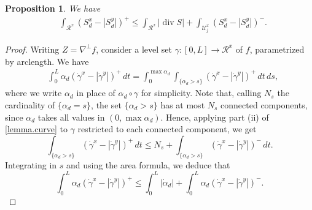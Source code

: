 \documentclass[10pt,a4paper]{amsart}
\newtheorem{proposition}{Proposition}
\DeclareMathOperator{\dive}{div}
\newcommand{\hau}{\mathcal{H}}
\newcommand{\str}{\mathcal{U}}
\begin{document}
\begin{proposition}\label{complement.bis}
	We have
	\begin{align*}
		&\int_{\mathcal{R}^x}(S_d^x-|S_d^y|)^+
		\le\int_{\mathcal{R}^x}\lvert \dive S\rvert+\int_{\str_j^x}(S_d^x-|S_d^y|)^-.
	\end{align*}
\end{proposition}

\begin{proof}
	Writing $Z=\nabla^\perp f$, consider a level set $\gamma:[0,L]\to\mathcal{R}^x$ of $f$, parametrized by arclength.
	We have
	\begin{align*}
		&\int_0^L\alpha_d(\dot\gamma^x-|\dot\gamma^y|)^+\,dt
		=\int_0^{\max\alpha_d}\int_{\{\alpha_d>s\}}(\dot\gamma^x-|\dot\gamma^y|)^+\,dt\,ds,
	\end{align*}
	where we write $\alpha_d$ in place of $\alpha_d\circ\gamma$ for simplicity.
	Note that, calling $N_s$ the cardinality of $\{\alpha_d=s\}$, the set $\{\alpha_d>s\}$
	has at most $N_s$ connected components, since $\alpha_d$
	takes all values in $(0,\max\alpha_d)$. Hence, applying part (ii) of
	\cref{lemma.curve} to $\gamma$ restricted to each connected component, we get
	$$\int_{\{\alpha_d>s\}}(\dot\gamma^x-|\dot\gamma^y|)^+\,dt
	\le N_s+\int_{\{\alpha_d>s\}}(\dot\gamma^x-|\dot\gamma^y|)^-\,dt.$$
	Integrating in $s$ and using the area formula, we deduce that
	$$\int_0^L\alpha_d(\dot\gamma^x-|\dot\gamma^y|)^+
	\le \int_0^L|\dot\alpha_d|+\int_0^L\alpha_d(\dot\gamma^x-|\dot\gamma^y|)^-.$$
    

\end{proof}
\end{document}
